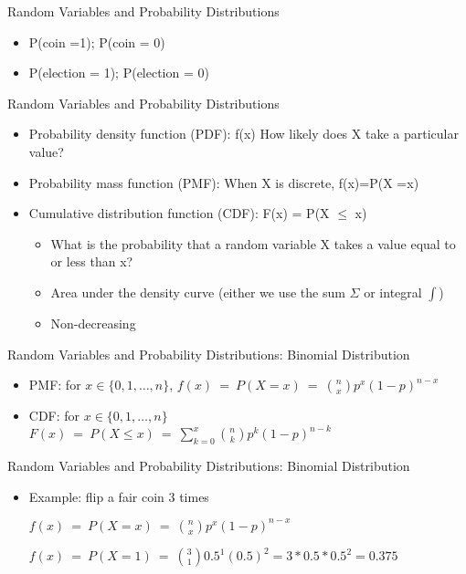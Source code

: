 \documentclass[presentation]{beamer}
\begin{document}
\begin{frame}[label={sec:orgd10db8c}]{Random Variables and Probability Distributions}
\begin{itemize}
\item P(coin =1); P(coin = 0)
\item P(election = 1); P(election = 0)
\end{itemize}
\end{frame}


\begin{frame}[label={sec:org7b05dca}]{Random Variables and Probability Distributions}
\begin{itemize}
\item \alert{Probability density function (PDF)}: f(x) How likely does X take a particular value?
\item \alert{Probability mass function (PMF)}: When X is discrete, f(x)=P(X =x)
\end{itemize}

\pause

\begin{itemize}
\item \alert{Cumulative distribution function (CDF)}: F(x) = P(X \(\leq\) x)
\begin{itemize}
\item What is the probability that a random variable X takes a value equal to or less than x?
\item Area under the density curve (either we use the sum \(\Sigma\) or integral \(\int\))
\item Non-decreasing
\end{itemize}
\end{itemize}
\end{frame}


\begin{frame}[label={sec:org294300d}]{Random Variables and Probability Distributions: Binomial Distribution}
\begin{itemize}
\item \alert{PMF}: for \(x \in \{0, 1, \dots, n\}\),
\(f(x) \ = \ P(X = x) \ = \ {n \choose x} p^x (1-p)^{n-x}\)

\item \alert{CDF}: for \(x \in \{0, 1, \dots, n\}\)
\(F(x) \ = \ P(X \le x) \ = \ \sum_{k = 0}^x {n\choose k} p^k (1-p)^{n-k}\)
\end{itemize}
\end{frame}



\begin{frame}[label={sec:orga5192ce}]{Random Variables and Probability Distributions: Binomial Distribution}
\begin{itemize}
\item Example: flip a fair coin 3 times

\(f(x) \ = \ P(X = x) \ = \ {n \choose x} p^x (1-p)^{n-x}\)

\(f(x) \ = \ P(X = 1) \ = \ {3 \choose 1} 0.5^1 (0.5)^{2} = 3*0.5*0.5^2 = 0.375\)
\end{itemize}
\end{frame}
\end{document}
